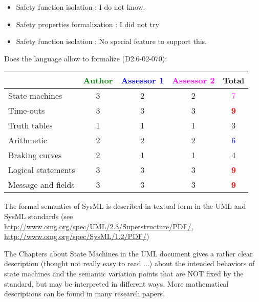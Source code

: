 \begin{author_comment}
\begin{itemize}
\item Safety function isolation :  I do not know.
\item Safety properties formalization : I did not try
\end{itemize}

\end{author_comment}

\begin{assessor1}
\begin{itemize}
\item Safety function isolation :  No special feature to support this.
\end{itemize}

\end{assessor1}

Does the language allow to formalize (D2.6-02-070):

\begin{tabular}{|l | c | c | c | c|}
\hline
& \textcolor{green}{Author} & \textcolor{blue}{Assessor 1} & \textcolor{magenta}{Assessor 2} & Total \\
\hline 
State machines  &3 & 2    & 2    & \textcolor{magenta}{7} \\
\hline
Time-outs  &3 & 3    & 3    & \textcolor{red}{\textbf{9}} \\
\hline
Truth tables  &1 & 1    & 1    & 3     \\
\hline
Arithmetic  & 2    & 2    & 2    & \textcolor{blue}{6} \\
\hline
Braking curves  &2 & 1    & 1    & 4     \\
\hline
Logical statements &3 & 3    & 3    & \textcolor{red}{\textbf{9}} \\
\hline
Message and fields &3 & 3    & 3    & \textcolor{red}{\textbf{9}} \\
\hline
\end{tabular}
\begin{author_comment}

The formal semantics of SysML is described in textual form in the UML and SysML standards
(see \url{http://www.omg.org/spec/UML/2.3/Superstructure/PDF/}, \url{http://www.omg.org/spec/SysML/1.2/PDF/})

The Chapters about State Machines in the UML
document gives a rather clear description (thought not really easy
to read ...) about the intended behaviors of state machines and the
semantic variation points that are NOT fixed by the standard, but may
be interpreted in different ways. More mathematical descriptions can
be found in  many research papers.
\end{author_comment}

